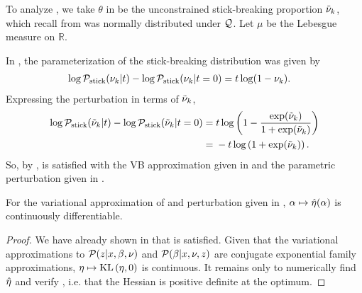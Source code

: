 \begin{ex}
%
To analyze , we take $\theta$
in 
be the unconstrained stick-breaking proportion $\tilde{\nu}_{k}$, which
recall from 
was normally distributed under $\mathcal{Q}$.
Let $\mu$ be the Lebesgue measure on $\mathbb{R}$.

In ,
the parameterization of the stick-breaking distribution was given by
\begin{align*}
  \log \mathcal{P}_{\mathrm{stick}}(\nu_{k} \vert t) - \log \mathcal{P}_{\mathrm{stick}}(\nu_{k} \vert t=0) ={}&
  t \log(1 - \nu_{k}).
\end{align*}
%
Expressing the perturbation in terms of
$\tilde{\nu}_{k}$,
%
\begin{align*}
%
\log \pstick(\lnuk \vert \t) - \log \pstick(\lnuk \vert \t=0) ={}&
\t \log\left(1 - \frac{\exp(\lnuk)}{1 + \exp(\lnuk)}\right)
\\={}&
-\t \log\left(1 + \exp(\lnuk)\right).
%
\end{align*}
%
So, by ,  is satisfied with
the VB approximation given in  and the parametric
perturbation given in .
%
\end{ex}




\begin{cor}
%
For the variational approximation of  and perturbation
given in , $\alpha \mapsto \hat\eta(\alpha)$
is continuously differentiable.
%
\begin{proof}
%
We have already shown in  that  is
satisfied.  Given that the variational approximations to $\mathcal{P}(z \vert x, \beta,
\nu)$ and $\mathcal{P}(\beta \vert x, \nu, z)$ are conjugate exponential family
approximations, $\eta \mapsto \mathrm{KL}\left(\eta, 0\right)$ is continuous.  It remains only to
numerically find $\hat\eta$ and verify , i.e.
that the Hessian is positive definite at the optimum.
%
\end{proof}
%
\end{cor}
